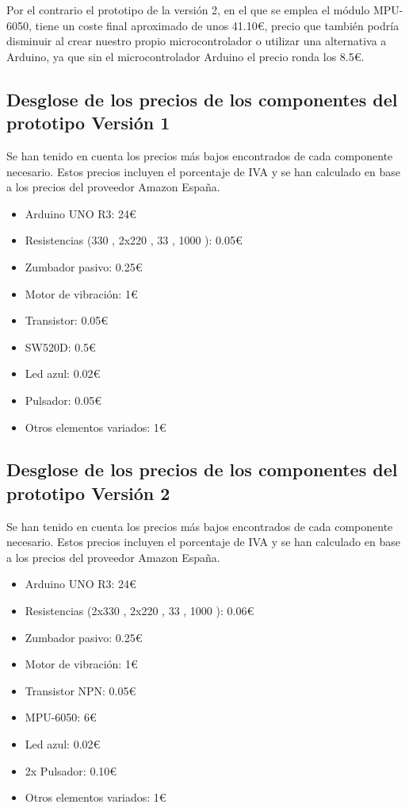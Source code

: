 Por el contrario el prototipo de la versión 2, en el que se emplea el módulo MPU-6050\cite{MPU6050_1,MPU6050_2}, tiene un coste final aproximado de unos 41.10€, precio que también podría disminuir al crear nuestro propio microcontrolador o utilizar una alternativa a Arduino, ya que sin el microcontrolador Arduino el precio ronda los 8.5€.


\subsection{Desglose de los precios de los componentes del prototipo Versión 1}

Se han tenido en cuenta los precios más bajos encontrados de cada componente necesario. Estos precios incluyen el porcentaje de IVA y se han calculado en base a los precios del proveedor Amazon España\cite{amazon}.
\begin{itemize}
    \item Arduino UNO R3: 24€
    \item Resistencias (330 \textOmega, 2x220 \textOmega, 33 \textOmega, 1000 \textOmega): 0.05€
    \item Zumbador pasivo: 0.25€
    \item Motor de vibración: 1€
    \item Transistor: 0.05€
    \item SW520D: 0.5€
    \item Led azul: 0.02€
    \item Pulsador: 0.05€
    \item Otros elementos variados: 1€
    
\end{itemize}

\subsection{Desglose de los precios de los componentes del prototipo Versión 2}
Se han tenido en cuenta los precios más bajos encontrados de cada componente necesario. Estos precios incluyen el porcentaje de IVA y se han calculado en base a los precios del proveedor Amazon España\cite{amazon}.
\begin{itemize}
    \item Arduino UNO R3: 24€
    \item Resistencias (2x330 \textOmega, 2x220 \textOmega, 33 \textOmega, 1000 \textOmega): 0.06€
    \item Zumbador pasivo: 0.25€
    \item Motor de vibración: 1€
    \item Transistor NPN: 0.05€
    \item MPU-6050: 6€
    \item Led azul: 0.02€
    \item 2x Pulsador: 0.10€
    \item Otros elementos variados: 1€
    
\end{itemize}


